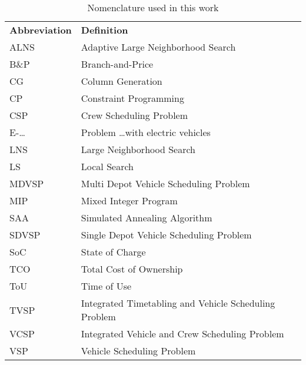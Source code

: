 \documentclass[]{article}
\begin{document}
\begin{table}
  \centering
  \begin{tabular}{ll}
    \toprule
    \multicolumn{1}{l}{\textbf{Abbreviation}} & \multicolumn{1}{l}{\textbf{Definition}}               \\
    \cmidrule(lr){1-1}\cmidrule(lr){2-2}
    ALNS                                      & Adaptive Large Neighborhood Search                    \\
    B\&P                                      & Branch-and-Price                                      \\
    CG                                        & Column Generation                                     \\
    CP                                        & Constraint Programming                                \\
    CSP                                       & Crew Scheduling Problem                               \\
    E-\dots                                   & Problem \dots with electric vehicles                  \\
    LNS                                       & Large Neighborhood Search                             \\
    LS                                        & Local Search                                          \\
    MDVSP                                     & Multi Depot Vehicle Scheduling Problem                \\
    MIP                                       & Mixed Integer Program                                 \\
    SAA                                       & Simulated Annealing Algorithm                         \\
    SDVSP                                     & Single Depot Vehicle Scheduling Problem               \\
    SoC                                       & State of Charge                                       \\
    TCO                                       & Total Cost of Ownership                               \\
    ToU                                       & Time of Use                                           \\
    TVSP                                      & Integrated Timetabling and Vehicle Scheduling Problem \\
    VCSP                                      & Integrated Vehicle and Crew Scheduling Problem        \\
    VSP                                       & Vehicle Scheduling Problem                            \\
    \bottomrule
  \end{tabular}
  \caption{Nomenclature used in this work}
  \label{tab:nomenclature}
\end{table}
\end{document}
